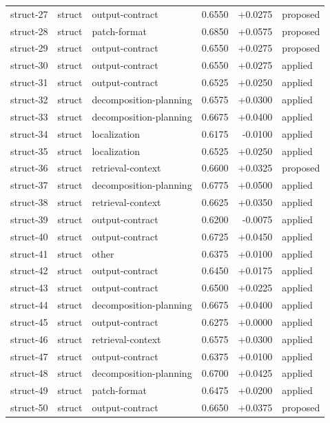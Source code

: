 \begin{center}
\begin{longtable}{llp{5.2cm}rrl}
struct-27 & struct & output-contract & 0.6550 & +0.0275 & proposed \\
struct-28 & struct & patch-format & 0.6850 & +0.0575 & proposed \\
struct-29 & struct & output-contract & 0.6550 & +0.0275 & proposed \\
struct-30 & struct & output-contract & 0.6550 & +0.0275 & applied \\
struct-31 & struct & output-contract & 0.6525 & +0.0250 & applied \\
struct-32 & struct & decomposition-planning & 0.6575 & +0.0300 & applied \\
struct-33 & struct & decomposition-planning & 0.6675 & +0.0400 & applied \\
struct-34 & struct & localization & 0.6175 & -0.0100 & applied \\
struct-35 & struct & localization & 0.6525 & +0.0250 & applied \\
struct-36 & struct & retrieval-context & 0.6600 & +0.0325 & proposed \\
struct-37 & struct & decomposition-planning & 0.6775 & +0.0500 & applied \\
struct-38 & struct & retrieval-context & 0.6625 & +0.0350 & applied \\
struct-39 & struct & output-contract & 0.6200 & -0.0075 & applied \\
struct-40 & struct & output-contract & 0.6725 & +0.0450 & applied \\
struct-41 & struct & other & 0.6375 & +0.0100 & applied \\
struct-42 & struct & output-contract & 0.6450 & +0.0175 & applied \\
struct-43 & struct & output-contract & 0.6500 & +0.0225 & applied \\
struct-44 & struct & decomposition-planning & 0.6675 & +0.0400 & applied \\
struct-45 & struct & output-contract & 0.6275 & +0.0000 & applied \\
struct-46 & struct & retrieval-context & 0.6575 & +0.0300 & applied \\
struct-47 & struct & output-contract & 0.6375 & +0.0100 & applied \\
struct-48 & struct & decomposition-planning & 0.6700 & +0.0425 & applied \\
struct-49 & struct & patch-format & 0.6475 & +0.0200 & applied \\
struct-50 & struct & output-contract & 0.6650 & +0.0375 & proposed \\

\end{longtable}
\end{center}

